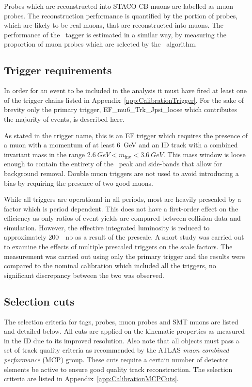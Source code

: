 Probes which are reconstructed into STACO CB muons are labelled as muon probes. The reconstruction performance is quantified by the portion of probes, which are likely to be real muons, that are reconstructed into muons. The performance of the \xsm\ tagger is estimated in a similar way, by measuring the proportion of muon probes which are selected by the \xsm\ algorithm.

\subsection{Trigger requirements}\label{sec:CalibrationTriggerRequirement}

In order for an event to be included in the analysis it must have fired at least one of the trigger chains listed in Appendix~\ref{app:CalibrationTrigger}. For the sake of brevity only the primary trigger, EF\_mu6\_Trk\_Jpsi\_loose which contributes the majority of events, is described here.

As stated in the trigger name, this is an EF trigger which requires the presence of a muon with a momentum of at least \SI{6}{GeV} and an ID track with a combined invariant mass in the range $\SI{2.6}{GeV}<m_{\textrm{inv}}<\SI{3.6}{GeV}$. This mass window is loose enough to   contain the entirety of the \jpsi\ peak and side-bands that allow for background removal. Double muon triggers are not used to avoid introducing a bias by requiring the presence of two good muons. 

While all triggers are operational in all periods, most are heavily prescaled by a factor which is period dependent. This does not have a first-order effect on the efficiency as only ratios of event yields are compared between collision data and simulation. However, the effective integrated luminosity is reduced to approximately \SI{200}{\per\nano\barn} as a result of the prescale. A short study was carried out to examine the effects of multiple prescaled triggers on the scale factors. The measurement was carried out using only the primary trigger and the results were compared to the nominal calibration which included all the triggers, no significant discrepancy between the two was observed.

\subsection{Selection cuts}\label{sec:CalibrationSelectionCuts}

The selection criteria for tags, probes, muon probes and SMT muons are listed and detailed below. All cuts are applied on the kinematic properties as measured in the ID due to its improved resolution. Also note that all objects must pass a set of track quality criteria as recommended by the ATLAS \emph{muon combined performance} (MCP) group. These cuts require a certain number of detector elements be active to ensure good quality track reconstruction. The selection criteria are listed in Appendix~\ref{app:CalibrationMCPCuts}.

